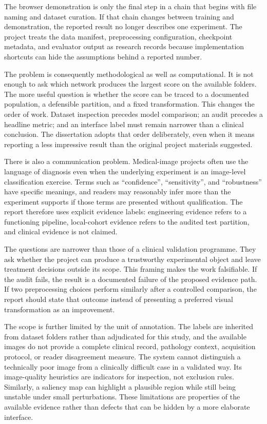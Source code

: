 The browser demonstration is only the final step in a chain that begins with file naming and dataset curation. If that chain changes between training and demonstration, the reported result no longer describes one experiment. The project treats the data manifest, preprocessing configuration, checkpoint metadata, and evaluator output as research records because implementation shortcuts can hide the assumptions behind a reported number.

The problem is consequently methodological as well as computational. It is not enough to ask which network produces the largest score on the available folders. The more useful question is whether the score can be traced to a documented population, a defensible partition, and a fixed transformation. This changes the order of work. Dataset inspection precedes model comparison; an audit precedes a headline metric; and an interface label must remain narrower than a clinical conclusion. The dissertation adopts that order deliberately, even when it means reporting a less impressive result than the original project materials suggested.

There is also a communication problem. Medical-image projects often use the language of diagnosis even when the underlying experiment is an image-level classification exercise. Terms such as ``confidence'', ``sensitivity'', and ``robustness'' have specific meanings, and readers may reasonably infer more than the experiment supports if those terms are presented without qualification. The report therefore uses explicit evidence labels: engineering evidence refers to a functioning pipeline, local-cohort evidence refers to the audited test partition, and clinical evidence is not claimed.

The questions are narrower than those of a clinical validation programme. They ask whether the project can produce a trustworthy experimental object and leave treatment decisions outside its scope. This framing makes the work falsifiable. If the audit fails, the result is a documented failure of the proposed evidence path. If two preprocessing choices perform similarly after a controlled comparison, the report should state that outcome instead of presenting a preferred visual transformation as an improvement.

The scope is further limited by the unit of annotation. The labels are inherited from dataset folders rather than adjudicated for this study, and the available images do not provide a complete clinical record, pathology context, acquisition protocol, or reader disagreement measure. The system cannot distinguish a technically poor image from a clinically difficult case in a validated way. Its image-quality heuristics are indicators for inspection, not exclusion rules. Similarly, a saliency map can highlight a plausible region while still being unstable under small perturbations. These limitations are properties of the available evidence rather than defects that can be hidden by a more elaborate interface.

